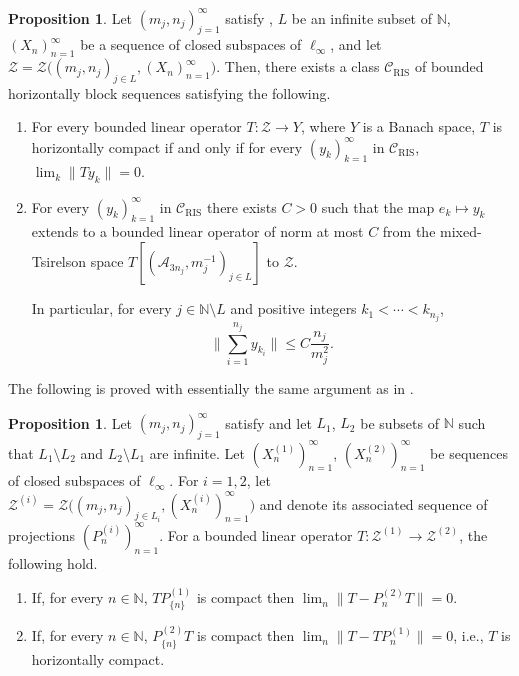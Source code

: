 \documentclass[11pt]{amsart}
\theoremstyle{definition}
\newtheorem{proposition}[theorem]{Proposition}
\newcommand{\N}{\mathbb{N}}
\numberwithin{equation}{section}
\begin{document}
\begin{proposition}
\label{RIS characterize horizontal compactness}
Let $(m_j,n_j)_{j=1}^\infty$ satisfy , $L$ be an infinite subset of $\N$, $(X_n)_{n=1}^\infty$ be a sequence of closed subspaces of $\ell_\infty$, and let $\mathcal{Z} = \mathcal{Z}\big((m_j,n_j)_{j\in L}, (X_n)_{n=1}^\infty\big)$. Then, there exists a class $\mathcal{C}_\mathrm{RIS}$ of bounded horizontally block sequences satisfying the following.
\begin{enumerate}[label=(\roman*),leftmargin=19pt]

    \item For every bounded linear operator $T:\mathcal{Z}\to Y$, where $Y$ is a Banach space, $T$ is horizontally compact if and only if for every $(y_k)_{k=1}^\infty$ in $\mathcal{C}_\mathrm{RIS}$, $\lim_k\|Ty_k\| = 0$.

    \item\label{RIS characterize horizontal compactness weight-missmatch} For every $(y_k)_{k=1}^\infty$ in $\mathcal{C}_\mathrm{RIS}$ there exists $C>0$ such that the map $e_k\mapsto y_k$ extends to a bounded linear operator of norm at most $C$ from the mixed-Tsirelson space $T[(\mathscr{A}_{3n_j},m^{-1}_j)_{j\in L}]$ to $\mathcal{Z}$.
    
    In particular, for every $j\in\N\setminus L$ and positive integers $k_1<\cdots<k_{n_{j}}$,
    \[\big\|\sum_{i=1}^{n_{j}}y_{k_i}\big\| \leq C\frac{n_j}{m_j^2}.\]

\end{enumerate}
\end{proposition}

The following is proved with essentially the same argument as in \cite[Lemma 10.3]{argyros:haydon:2011}.

\begin{proposition}
\label{main incomparability result}
Let $(m_j,n_j)_{j=1}^\infty$ satisfy  and let $L_1$, $L_2$ be subsets of $\N$ such that $L_1\setminus L_2$ and $L_2\setminus L_1$ are infinite. Let $(X^{(1)}_n)_{n=1}^\infty$, $(X^{(2)}_n)_{n=1}^\infty$ be sequences of closed subspaces of $\ell_\infty$. For $i=1,2$, let $\mathcal{Z}^{(i)} = \mathcal{Z}\big((m_j,n_j)_{j\in L_i},(X_n^{(i)})_{n=1}^\infty\big)$ and denote its associated sequence of projections $(P_n^{(i)})_{n=1}^\infty$. For a bounded linear operator $T:\mathcal{Z}^{(1)}\to\mathcal{Z}^{(2)}$, the following hold.
\begin{enumerate}[label=(\roman*),leftmargin=19pt]
    
    \item\label{main incomparability result i} If, for every $n\in\N$, $T P_{\{n\}}^{(1)}$ is compact then $\lim_n\|T-P_n^{(2)}T\| = 0$.

    \item\label{main incomparability result ii} If, for every $n\in\N$, $ P_{\{n\}}^{(2)}T$ is compact then $\lim_n\|T-TP_n^{(1)}\| = 0$, i.e., $T$ is horizontally compact.
    
\end{enumerate}

\end{proposition}
\end{document}
